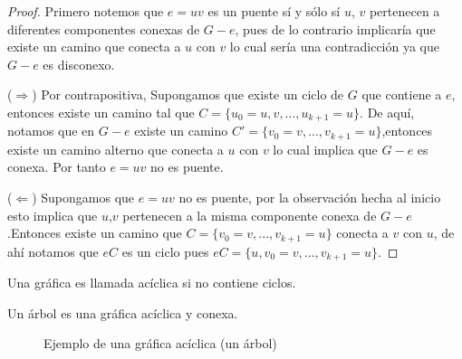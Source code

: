  \begin{proof}
 Primero notemos que $e=uv$ es un puente sí y sólo sí $u$, $v$ pertenecen a diferentes componentes conexas de $G-e$, pues de lo contrario implicaría que existe un camino que conecta a $u$ con $v$ lo cual sería una contradicción ya que $G-e$ es disconexo.
 
     ($\Rightarrow$) Por contrapositiva, Supongamos que existe un ciclo de $G$ que contiene a $e$, entonces existe un camino tal que $C = \{u_0=u,v,...,u_{k+1}=u\}$.
     De aquí, notamos que en $G-e$ existe un camino $C' = \{v_0=v,...,v_{k+1} = u\}$,entonces existe un camino alterno que conecta a $u$ con $v$ lo cual implica que $G-e$ es conexa. Por tanto $e=uv$ no es puente.
     
     ($\Leftarrow$) Supongamos que $e=uv$ no es puente, por la observación hecha al inicio esto implica que $u$,$v$ pertenecen a la misma componente conexa de $G-e$.Entonces existe un camino que $C=\{v_0=v,...,v_{k+1} = u\}$ conecta a $v$ con $u$, de ahí notamos que $eC$ es un ciclo pues $eC = \{u,v_0=v,...,v_{k+1}=u\}$.
     \end{proof}
 

 \begin{definition}
     Una gráfica es llamada acíclica si no contiene ciclos.
 \end{definition}


 \begin{definition}[Árbol]
  Un árbol es una gráfica acíclica y conexa.
 \end{definition}

 \begin{example}
    \begin{figure}[h]
    \centering
    \caption{Ejemplo de una gráfica acíclica (un árbol)}
    \label{fig:aciclica}
\end{figure}

 \end{example}
 
